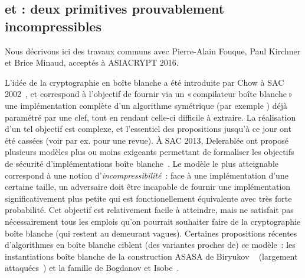 \subsection{\pc et \cdb : deux primitives prouvablement incompressibles \cite{puppycipher}}

Nous décrivons ici des travaux communs avec Pierre-Alain Fouque, Paul Kirchner et Brice Minaud, acceptés à ASIACRYPT 2016.

\medskip

L'idée de la cryptographie en boîte blanche a été introduite par Chow \etal à SAC 2002~\cite{DBLP:conf/sacrypt/ChowEJO02},
et correspond à l'objectif de fournir via un «\,compilateur boîte blanche\,» une implémentation complète d'un algorithme symétrique (par exemple \aes) déjà paramétré par
une clef, tout en rendant celle-ci difficile à extraire. La réalisation d'un tel objectif est complexe, et l'essentiel des propositions
jusqu'à ce jour ont été cassées (voir par ex. \cite{HenriWB} pour une revue).
À SAC 2013, Delerablée \etal ont proposé plusieurs modèles plus ou moins exigeants
permettant de formaliser les objectifs de sécurité d'implémentations boîte blanche~\cite{DBLP:conf/sacrypt/DelerableeLPR13}.
Le modèle le plus atteignable correspond à une notion d'\emph{incompressibilité}~: face à une implémentation d'une certaine taille, un adversaire doit être incapable de fournir une implémentation
significativement plus petite qui est fonctionellement équivalente avec très forte probabilité. Cet objectif est relativement facile à atteindre, mais ne satisfait pas nécessairement
tous les emplois qu'on pourrait souhaiter faire de la cryptographie boîte blanche (qui restent au demeurant vagues). Certaines propositions récentes d'algorithmes en boîte blanche ciblent
(des variantes proches de) ce modèle~: les instantiations boîte blanche de la construction ASASA de Biryukov \etal~\cite{DBLP:conf/asiacrypt/BiryukovBK14}
(largement attaquées~\cite{DBLP:journals/iacr/DinurDKL15,DBLP:conf/asiacrypt/MinaudDFK15}) et la famille \spacehard de Bogdanov et Isobe~\cite{DBLP:conf/ccs/BogdanovI15}.

